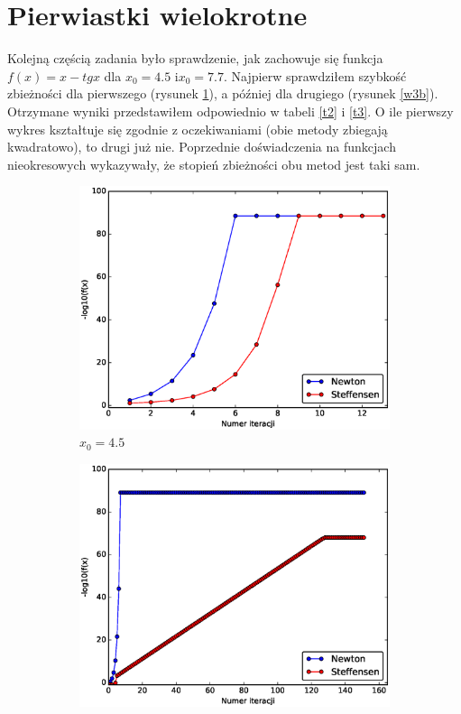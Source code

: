 \documentclass{article}
\begin{document}
\section{Pierwiastki wielokrotne}
Kolejną częścią zadania było sprawdzenie, jak zachowuje się funkcja $f(x)=x-tg x$ dla $x_0=4.5$ i$x_0=7.7$. Najpierw sprawdziłem szybkość zbieżności dla pierwszego (rysunek \ref{w3a}), a później dla drugiego (rysunek \ref{w3b}). Otrzymane wyniki przedstawiłem odpowiednio w tabeli \ref{t2} i \ref{t3}. O ile pierwszy wykres kształtuje się zgodnie z oczekiwaniami (obie metody zbiegają kwadratowo), to drugi już nie. Poprzednie doświadczenia na funkcjach nieokresowych wykazywały, że stopień zbieżności obu metod jest taki sam.
\begin{figure}[H]
    \centering
    \begin{subfigure}[b]{0.45\textwidth}
        \includegraphics[width=\textwidth]{figure_4a.eps}
        \caption{$x_0=4.5$}
        \label{w3a}
    \end{subfigure}
    \begin{subfigure}[b]{0.45\textwidth}
        \includegraphics[width=\textwidth]{figure_4b.eps}

\end{subfigure}
\end{figure}
\end{document}
